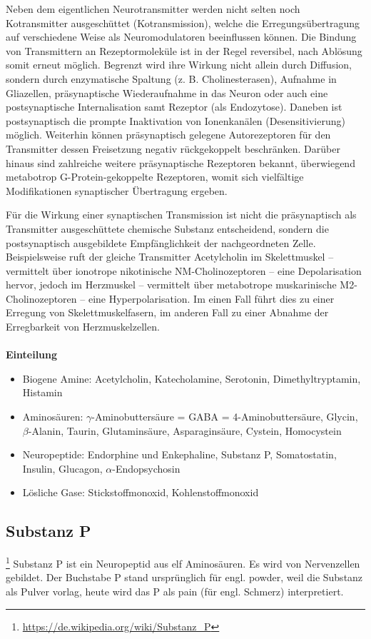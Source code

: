 Neben dem eigentlichen Neurotransmitter werden nicht selten noch Kotransmitter ausgeschüttet (Kotransmission), welche die Erregungsübertragung auf verschiedene Weise als Neuromodulatoren beeinflussen können. Die Bindung von Transmittern an Rezeptormoleküle ist in der Regel reversibel, nach Ablösung somit erneut möglich. Begrenzt wird ihre Wirkung nicht allein durch Diffusion, sondern durch enzymatische Spaltung (z. B. Cholinesterasen), Aufnahme in Gliazellen, präsynaptische Wiederaufnahme in das Neuron oder auch eine postsynaptische Internalisation samt Rezeptor (als Endozytose). Daneben ist postsynaptisch die prompte Inaktivation von Ionenkanälen (Desensitivierung) möglich. Weiterhin können präsynaptisch gelegene Autorezeptoren für den Transmitter dessen Freisetzung negativ rückgekoppelt beschränken. Darüber hinaus sind zahlreiche weitere präsynaptische Rezeptoren bekannt, überwiegend metabotrop G-Protein-gekoppelte Rezeptoren, womit sich vielfältige Modifikationen synaptischer Übertragung ergeben.

Für die Wirkung einer synaptischen Transmission ist nicht die präsynaptisch als Transmitter ausgeschüttete chemische Substanz entscheidend, sondern die postsynaptisch ausgebildete Empfänglichkeit der nachgeordneten Zelle. Beispielsweise ruft der gleiche Transmitter Acetylcholin im Skelettmuskel – vermittelt über ionotrope nikotinische NM-Cholinozeptoren – eine Depolarisation hervor, jedoch im Herzmuskel – vermittelt über metabotrope muskarinische M2-Cholinozeptoren – eine Hyperpolarisation. Im einen Fall führt dies zu einer Erregung von Skelettmuskelfasern, im anderen Fall zu einer Abnahme der Erregbarkeit von Herzmuskelzellen.
\\\\
\textbf{Einteilung}\\
\begin{itemize}
	\item Biogene Amine: Acetylcholin, Katecholamine, Serotonin, Dimethyltryptamin, Histamin
	\item Aminosäuren: $\gamma$-Aminobuttersäure = GABA = 4-Aminobuttersäure, Glycin, $\beta$-Alanin, Taurin, Glutaminsäure, Asparaginsäure, Cystein, Homocystein
	\item Neuropeptide: Endorphine und Enkephaline, Substanz P, Somatostatin, Insulin, Glucagon, $\alpha$-Endopsychosin
	\item Lösliche Gase: Stickstoffmonoxid, Kohlenstoffmonoxid
\end{itemize}

\subsection{Substanz P}\footnote{\url{https://de.wikipedia.org/wiki/Substanz_P}}
Substanz P ist ein Neuropeptid aus elf Aminosäuren. Es wird von Nervenzellen gebildet. Der Buchstabe P stand ursprünglich für engl. powder, weil die Substanz als Pulver vorlag, heute wird das P als pain (für engl. Schmerz) interpretiert.

